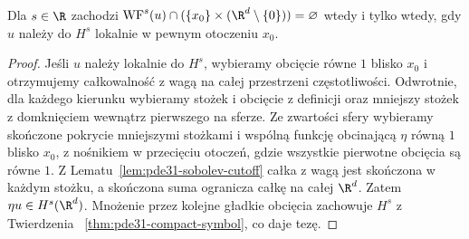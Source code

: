 \begin{wniosek}
\label{cor:pde31-wfs-projection}
Dla $s\in\R$ zachodzi
$\operatorname{WF}^s(u)\cap(\{x_0\}\times
(\R^d\setminus\{0\}))=\varnothing$
wtedy i tylko wtedy, gdy $u$ należy do $H^s$
lokalnie w pewnym otoczeniu $x_0$.
\end{wniosek}
\begin{proof}
Jeśli $u$ należy lokalnie do $H^s$,
wybieramy obcięcie równe $1$ blisko $x_0$
i otrzymujemy całkowalność z wagą na całej
przestrzeni częstotliwości.
Odwrotnie, dla każdego kierunku wybieramy
stożek i obcięcie z definicji oraz mniejszy stożek
z domknięciem wewnątrz pierwszego na sferze.
Ze zwartości sfery wybieramy skończone pokrycie
mniejszymi stożkami i wspólną funkcję obcinającą
$\eta$ równą $1$ blisko $x_0$, z nośnikiem
w przecięciu otoczeń, gdzie wszystkie pierwotne
obcięcia są równe $1$.
Z Lematu~\ref{lem:pde31-sobolev-cutoff}
całka z wagą jest skończona w każdym stożku,
a skończona suma ogranicza całkę na całej
$\R^d$. Zatem $\eta u\in H^s(\R^d)$.
Mnożenie przez kolejne gładkie obcięcia
zachowuje $H^s$ z Twierdzenia
~\ref{thm:pde31-compact-symbol}, co daje tezę.
\end{proof}

